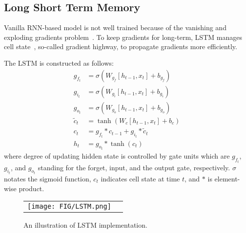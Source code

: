 \subsection{Long Short Term Memory}
\label{sec:pre:lstm}
Vanilla RNN-based model is not well trained because of the vanishing and exploding gradients problem~\cite{Vanish}.
To keep gradients for long-term, LSTM manages cell state~\cite{LSTM}, so-called gradient highway, to propagate gradients more efficiently.

The LSTM is constructed as follows:
\begin{align*}
	g_{f_t} &= \sigma(W_{g_f}[h_{t-1},x_t]+b_{g_f}) \\
	g_{i_t} &= \sigma(W_{g_i}[h_{t-1},x_t]+b_{g_i}) \\
	g_{o_t} &= \sigma(W_{g_o}[h_{t-1},x_t]+b_{g_o}) \\
	\tilde{c}_t &= \tanh(W_c[h_{t-1},x_t]+b_c) \\
	c_t &= g_{f_t}*c_{t-1}+g_{i_t}*\tilde{c}_t \\
	h_t &= g_{o_t}*\tanh(c_t)
\end{align*}
where degree of updating hidden state is controlled by gate units which are $g_{f_t}$, $g_{i_t}$, and $g_{o_t}$ standing for the forget, input, and the output gate, respectively.
$\sigma$ notates the sigmoid function, $c_t$ indicates cell state at time $t$, and $*$ is element-wise product.

\begin{figure}[h]
\begin{center}
\begin{tabular}{cc}
     \texttt{[image: FIG/LSTM.png]} \\
\end{tabular}
\caption{
	An illustration of LSTM implementation.
}
\label{fig:lstm}
\end{center}
\end{figure}

